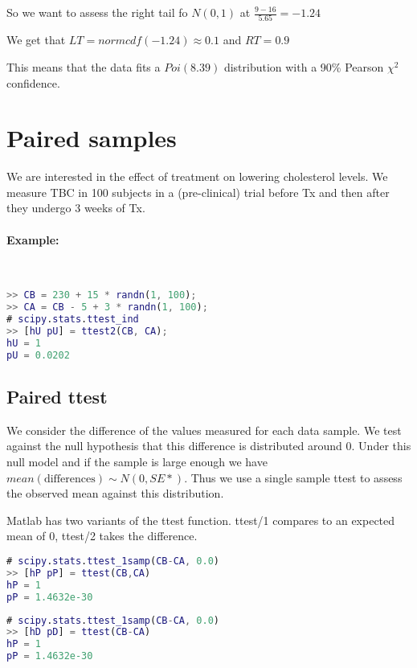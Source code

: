 \documentclass[a4paper]{article}
\begin{document}
So we want to assess the right tail fo $N(0,1)$ at $\frac{9-16}{5.65}=-1.24$

We get that $LT=normcdf(-1.24)\approx0.1$ and $RT=0.9$

This means that the data fits a $Poi(8.39)$ distribution with a 90\% Pearson $\chi^2$ confidence.

\section{Paired samples}
We are interested in the effect of treatment on lowering cholesterol levels.
We measure TBC in 100 subjects in a (pre-clinical) trial before Tx and then after they undergo 3 weeks of Tx.

\paragraph{Example:}\ \\

\begin{lstlisting}[language=Matlab]
>> CB = 230 + 15 * randn(1, 100);
>> CA = CB - 5 + 3 * randn(1, 100);
# scipy.stats.ttest_ind
>> [hU pU] = ttest2(CB, CA);
hU = 1
pU = 0.0202
\end{lstlisting}


\subsection{Paired ttest}
We consider the difference of the values measured for each data sample.
We test against the null hypothesis that this difference is distributed around 0.
Under this null model and if the sample is large enough we have $mean(\text{differences}) \sim N(0,SE*)$.
Thus we use a single sample ttest to assess the observed mean against this distribution.

Matlab has two variants of the ttest function. ttest/1 compares to an expected mean of 0, ttest/2 takes the difference.

\begin{lstlisting}[language=Matlab]
# scipy.stats.ttest_1samp(CB-CA, 0.0)
>> [hP pP] = ttest(CB,CA)
hP = 1
pP = 1.4632e-30
\end{lstlisting}

\begin{lstlisting}[language=Matlab]
# scipy.stats.ttest_1samp(CB-CA, 0.0)
>> [hD pD] = ttest(CB-CA)
hP = 1
pP = 1.4632e-30
\end{lstlisting}
\end{document}
